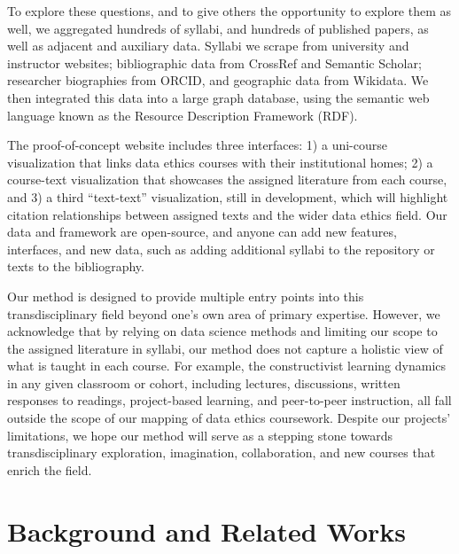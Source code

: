 \documentclass[
]{article}
\begin{document}
To explore these questions, and to give others the opportunity to
explore them as well, we aggregated hundreds of syllabi, and hundreds of
published papers, as well as adjacent and auxiliary data. Syllabi we
scrape from university and instructor websites; bibliographic data from
CrossRef and Semantic Scholar; researcher biographies from ORCID, and
geographic data from Wikidata. We then integrated this data into a large
graph database, using the semantic web language known as the Resource
Description Framework (RDF).

The proof-of-concept website includes three interfaces: 1) a uni-course
visualization that links data ethics courses with their institutional
homes; 2) a course-text visualization that showcases the assigned
literature from each course, and 3) a third ``text-text'' visualization,
still in development, which will highlight citation relationships
between assigned texts and the wider data ethics field. Our data and
framework are open-source, and anyone can add new features, interfaces,
and new data, such as adding additional syllabi to the repository or
texts to the bibliography.

Our method is designed to provide multiple entry points into this
transdisciplinary field beyond one's own area of primary expertise.
However, we acknowledge that by relying on data science methods and
limiting our scope to the assigned literature in syllabi, our method
does not capture a holistic view of what is taught in each course. For
example, the constructivist learning dynamics in any given classroom or
cohort, including lectures, discussions, written responses to readings,
project-based learning, and peer-to-peer instruction, all fall outside
the scope of our mapping of data ethics coursework. Despite our
projects' limitations, we hope our method will serve as a stepping stone
towards transdisciplinary exploration, imagination, collaboration, and
new courses that enrich the field.

\hypertarget{background-and-related-works}{%
\section{Background and Related
Works}\label{background-and-related-works}}
\end{document}
